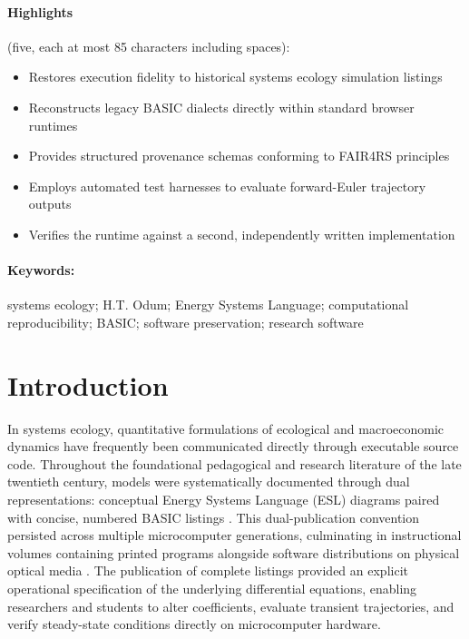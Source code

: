\documentclass[11pt,a4paper]{article}
\begin{document}
\paragraph{Highlights} (five, each at most 85 characters including spaces):
\begin{itemize}
\item Restores execution fidelity to historical systems ecology simulation listings
\item Reconstructs legacy BASIC dialects directly within standard browser runtimes
\item Provides structured provenance schemas conforming to FAIR4RS principles
\item Employs automated test harnesses to evaluate forward-Euler trajectory outputs
\item Verifies the runtime against a second, independently written implementation
\end{itemize}

\paragraph{Keywords:} systems ecology; H.T. Odum; Energy Systems Language; computational reproducibility; BASIC; software preservation; research software

\section{Introduction}
\label{sec:intro}

In systems ecology, quantitative formulations of ecological and macroeconomic dynamics have frequently been communicated directly through executable source code. Throughout the foundational pedagogical and research literature of the late twentieth century, models were systematically documented through dual representations: conceptual Energy Systems Language (ESL) diagrams paired with concise, numbered BASIC listings \citep{odum1983,odumMinimodels,odumOdum2000}. This dual-publication convention persisted across multiple microcomputer generations, culminating in instructional volumes containing printed programs alongside software distributions on physical optical media \citep{odumOdum2000}. The publication of complete listings provided an explicit operational specification of the underlying differential equations, enabling researchers and students to alter coefficients, evaluate transient trajectories, and verify steady-state conditions directly on microcomputer hardware.
\end{document}
